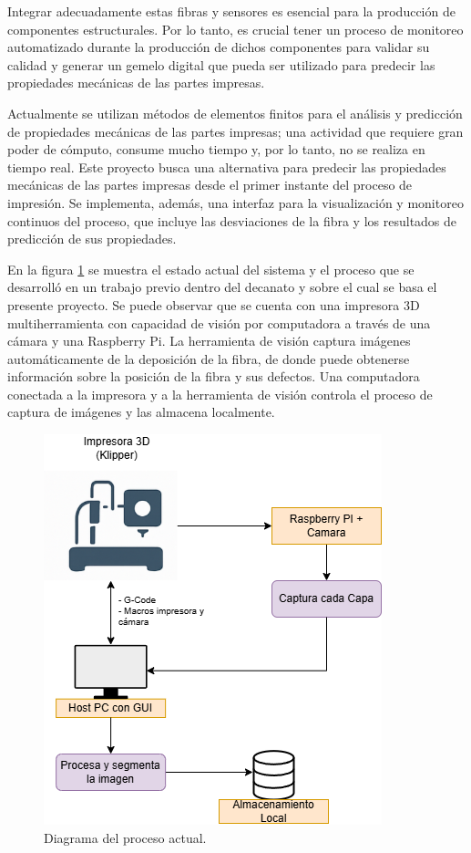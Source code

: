 \documentclass[
11pt, %
]{charter}
\begin{document}
Integrar adecuadamente estas fibras y sensores es esencial para la producción de componentes estructurales. Por lo tanto, es crucial tener un proceso de monitoreo automatizado durante la producción de dichos componentes para validar su calidad y generar un gemelo digital que pueda ser utilizado para predecir las propiedades mecánicas de las partes impresas.

Actualmente se utilizan métodos de elementos finitos para el análisis y predicción de propiedades mecánicas de las partes impresas; una actividad que requiere gran poder de cómputo, consume mucho tiempo y, por lo tanto, no se realiza en tiempo real. Este proyecto busca una alternativa para predecir las propiedades mecánicas de las partes impresas desde el primer instante del proceso de impresión. Se implementa, además, una interfaz para la visualización y monitoreo continuos del proceso, que incluye las desviaciones de la fibra y los resultados de predicción de sus propiedades.

En la figura \ref{fig:procesoActual} se muestra el estado actual del sistema y el proceso que se desarrolló en un trabajo previo dentro del decanato y sobre el cual se basa el presente proyecto. Se puede observar que se cuenta con una impresora 3D multiherramienta con capacidad de visión por computadora a través de una cámara y una Raspberry Pi. La herramienta de visión captura imágenes automáticamente de la deposición de la fibra, de donde puede obtenerse información sobre la posición de la fibra y sus defectos. Una computadora conectada a la impresora y a la herramienta de visión controla el proceso de captura de imágenes y las almacena localmente.

\begin{figure}[htpb]
\centering 
\includegraphics[width=.5\textwidth]{Figuras/proceso-Actual.png}
\caption{Diagrama del proceso actual.}
\label{fig:procesoActual}
\end{figure}
\end{document}
